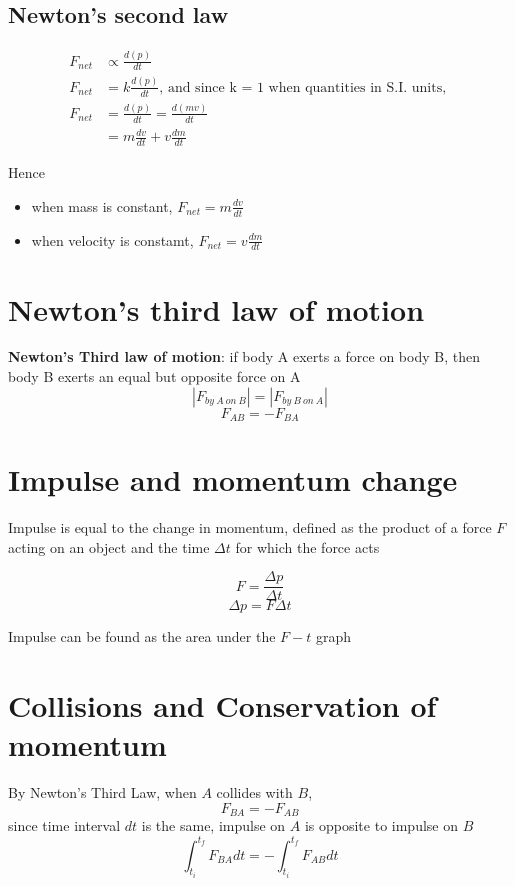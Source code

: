 \documentclass[a4paper, 10pt]{article}
\begin{document}
\subsection{Newton's second law}
\begin{align*}
   F_{net} &\propto \frac{d(p)}{dt} \\
   F_{net} &= k\frac{d(p)}{dt} \text{, and since k = 1 when quantities in S.I. units, } \\
   F_{net} &=  \frac{d(p)}{dt} = \frac{d(mv)}{dt} \\
           &= m\frac{dv}{dt} + v\frac{dm}{dt} 
\end{align*}	

Hence 
\begin{itemize}
   \item when mass is constant, $F_{net} = m\frac{dv}{dt}$ 
   \item when velocity is constamt, $F_{net} = v\frac{dm}{dt}$ 
\end{itemize}

\section{Newton's third law of motion}
\begin{framed}
   \textbf{Newton's Third law of motion}: if body A exerts a force on body B, then body B exerts an equal but opposite force on A 
   \[
      |F_{by\  A\  on\  B}| = |F_{by\  B\  on\  A}|
   \]
   \[
      F_{AB} = -F_{BA}
   \]
\end{framed}	

\section{Impulse and momentum change}
Impulse is equal to the change in momentum, defined as the product of a force $F$ acting on an object and the time $\Delta t$ for which the force acts

\[
   F = \frac{\Delta p}{\Delta t}
\]
\[
\Delta p = F \Delta t
\]

Impulse can be found as the area under the $F-t$ graph
\section{Collisions and Conservation of momentum}
By Newton's Third Law, when $A$ collides with $B$, 
\[
F_{BA} = -F_{AB}  
\]
since time interval $dt$ is the same, impulse on $A$ is opposite to impulse on $B$ 
\[
   \int_{t_i}^{t_f} F_{BA} dt = - \int_{t_i}^{t_f} F_{AB} dt
\]
\end{document}
